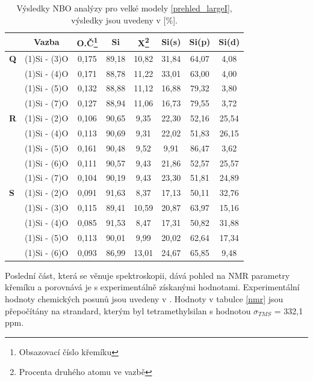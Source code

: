 \documentclass[
digital, %
table,   %
lof,     %
lot,     %
oneside,
]{fithesis3}
\begin{document}
\begin{table}
\caption{Výsledky NBO analýzy pro velké modely \ref{prehled_largeI}, výsledky jsou uvedeny v [\%].}
\begin{minipage}{\textwidth}
\begin{center}
\begin{tabular}{|l|c|c|c|c|c|c|c|}
\hline
\label{nbo_largeI}&  Vazba & O.Č\footnote{Obsazovací číslo křemíku} & Si & X\footnote{Procenta druhého atomu ve  vazbě} & Si(s) & Si(p) &Si(d) \\ \hline
\textbf{Q}&  (1)Si - (3)O   & 0,175 & 89,18   & 10,82   & 31,84   & 64,07   & 4,08   \\ \hline
&  (1)Si - (4)O  & 0,171 & 88,78   & 11,22   & 33,01   & 63,00   & 4,00   \\ \hline
& (1)Si - (5)O & 0,132 & 88,88   & 11,12   & 16,88   & 79,32   & 3,80   \\ \hline
& (1)Si - (7)O & 0,127 & 88,94   & 11,06   & 16,73   & 79,55   & 3,72   \\ \hline
\textbf{R} & (1)Si - (2)O  & 0,106 & 90,65   & 9,35   & 22,30   & 52,16   & 25,54   \\ \hline
& (1)Si - (4)O & 0,113 & 90,69   & 9,31   & 22,02   & 51,83   & 26,15   \\ \hline
&  (1)Si - (5)O  & 0,161 & 90,48   & 9,52   & 9,91   & 86,47   & 3,62   \\ \hline
&  (1)Si - (6)O & 0,111 & 90,57   & 9,43   & 21,86   & 52,57   & 25,57   \\ \hline
& (1)Si - (7)O & 0,104 & 90,19   & 9,43   & 23,30   & 51,81   & 24,89   \\ \hline
\textbf{S}&(1)Si - (2)O  & 0,091 & 91,63   & 8,37   & 17,13   & 50,11   & 32,76   \\ \hline
& (1)Si - (3)O  & 0,115 & 89,41   & 10,59   & 20,87   & 63,97   & 15,16   \\ \hline
&   (1)Si - (4)O   & 0,085 & 91,53   & 8,47   & 17,31   & 50,82   & 31,88   \\ \hline
&  (1)Si - (5)O  & 0,113 & 90,01   & 9,99   & 20,02   & 62,64   & 17,34   \\ \hline
& (1)Si - (6)O & 0,093 & 86,99   & 13,01   & 24,67   & 65,85   & 9,48   \\ \hline
\end{tabular}\end{center}\end{minipage}\end{table}

Poslední část, která se věnuje spektroskopii, dává pohled na NMR parametry křemíku a porovnává je s experimentálně získanými hodnotami. Experimentální hodnoty chemických posunů jsou uvedeny v \cite{1316862}. Hodnoty v tabulce \ref{nmr} jsou přepočítány na strandard, kterým byl tetramethylsilan s hodnotou $\sigma_{TMS}$ = 332,1 ppm.
\end{document}
